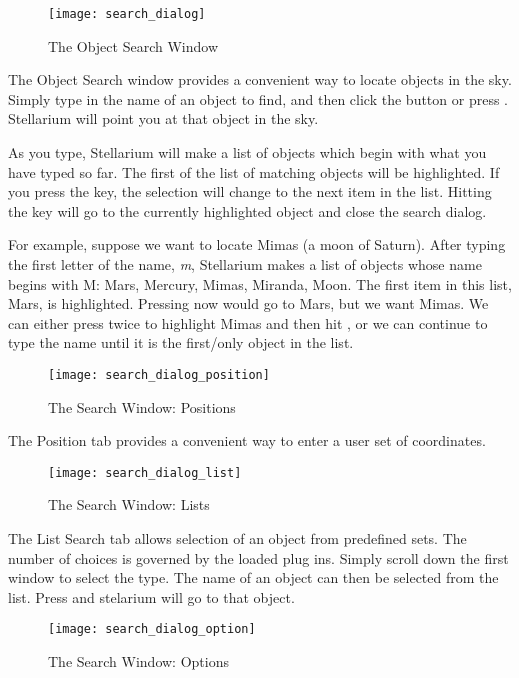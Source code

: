 \begin{figure}[h]
\centering\texttt{[image: search\_dialog]}
\caption{The Object Search Window}
\label{fig:gui:search}
\end{figure}

The Object Search window provides a convenient way to locate objects in
the sky. Simply type in the name of an object to find, and then click
the  button or press . Stellarium will point you at that
object in the sky.

As you type, Stellarium will make a list of objects which begin with
what you have typed so far. The first of the list of matching objects
will be highlighted. If you press the  key, the selection will change
to the next item in the list. Hitting the  key will go to the
currently highlighted object and close the search dialog.

For example, suppose we want to locate Mimas (a moon of Saturn). After
typing the first letter of the name, \emph{m}, Stellarium makes a list
of objects whose name begins with M: Mars, Mercury, Mimas, Miranda,
Moon. The first item in this list, Mars, is highlighted. Pressing 
now would go to Mars, but we want Mimas. We can either press  twice
to highlight Mimas and then hit , or we can continue to type the
name until it is the first/only object in the list.

\begin{figure}[h]
\centering\texttt{[image: search\_dialog\_position]}
\caption{The Search Window: Positions}
\label{fig:gui:search:position}
\end{figure}

The Position tab provides a convenient way to enter a user set
of coordinates.

\begin{figure}[h]
\centering\texttt{[image: search\_dialog\_list]}
\caption{The Search Window: Lists}
\label{fig:gui:search:position}
\end{figure}

The List Search tab allows selection of an object from predefined
sets.  The number of choices is governed by the loaded plug
ins. Simply scroll down the first window to select the type. The name
of an object can then be selected from the list. Press  and
stelarium will go to that object.


\begin{figure}[h]
\centering\texttt{[image: search\_dialog\_option]}
\caption{The Search Window: Options}
\label{fig:gui:search:options}
\end{figure}

